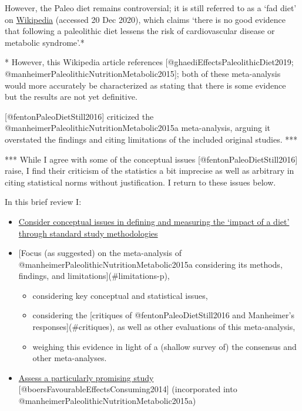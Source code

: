 \documentclass[]{article}
\providecommand{\tightlist}{%
  \setlength{\itemsep}{0pt}\setlength{\parskip}{0pt}}
\begin{document}
However, the Paleo diet remains controversial; it is still referred to
as a `fad diet' on
\href{https://en.wikipedia.org/wiki/Paleolithic_diet}{Wikipedia}
(accessed 20 Dec 2020), which claims `there is no good evidence that
following a paleolithic diet lessens the risk of cardiovascular disease
or metabolic syndrome'.*

* However, this Wikipedia article references
{[}@ghaediEffectsPaleolithicDiet2019;
@manheimerPaleolithicNutritionMetabolic2015{]}; both of these
meta-analysis would more accurately be characterized as stating that
there is some evidence but the results are not yet definitive.

{[}@fentonPaleoDietStill2016{]} criticized the
@manheimerPaleolithicNutritionMetabolic2015a meta-analysis, arguing it
overstated the findings and citing limitations of the included original
studies. ***

*** While I agree with some of the conceptual issues
{[}@fentonPaleoDietStill2016{]} raise, I find their criticism of the
statistics a bit imprecise as well as arbitrary in citing statistical
norms without justification. I return to these issues below.

\hfill\break

In this brief review I:

\begin{itemize}
\item
  \protect\hyperlink{conceptual}{Consider conceptual issues in defining
  and measuring the `impact of a diet' through standard study
  methodologies}
\item
  {[}Focus (as suggested) on the meta-analysis of
  @manheimerPaleolithicNutritionMetabolic2015a considering its methods,
  findings, and limitations{]}(\#limitations-p),

  \begin{itemize}
  \tightlist
  \item
    considering key conceptual and statistical issues,
  \item
    considering the {[}critiques of @fentonPaleoDietStill2016 and
    Manheimer's responses{]}(\#critiques), as well as other evaluations
    of this meta-analysis,
  \item
    weighing this evidence in light of a (shallow survey of) the
    consensus and other meta-analyses.
  \end{itemize}
\item
  \protect\hyperlink{boers}{Assess a particularly promising study}
  {[}@boersFavourableEffectsConsuming2014{]} (incorporated into
  @manheimerPaleolithicNutritionMetabolic2015a)
\end{itemize}
\end{document}
